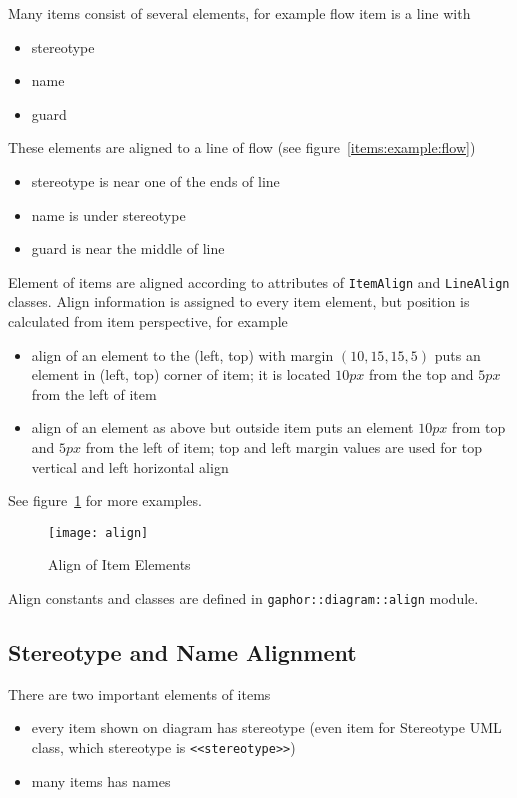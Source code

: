 \documentclass{book}
\newcommand{\rmodule}[1]{\texttt{#1}}
\newcommand{\rclass}[1]{\texttt{#1}}
\newcommand{\rstereotype}[1]{\texttt{<<#1>>}}
\begin{document}
Many items consist of several elements, for example flow item is a line
with
\begin{itemize}
\item stereotype
\item name
\item guard
\end{itemize}
These elements are aligned to a line of flow (see
figure~\ref{items:example:flow})
\begin{itemize}
\item stereotype is near one of the ends of line
\item name is under stereotype
\item guard is near the middle of line
\end{itemize}

Element of items are aligned according to attributes of
\rclass{ItemAlign} and \rclass{LineAlign} classes. Align information is
assigned to every item element, but position is calculated from item
perspective, for example
\begin{itemize}
\item align of an element to the (left, top) with margin $(10, 15, 15, 5)$
puts an element in (left, top) corner of item; it is located $10px$ from the top
and $5px$ from the left of item
\item align of an element as above but outside item puts an element $10px$
from top and $5px$ from the left of item; top and left margin values are
used for top vertical and left horizontal align
\end{itemize}
See figure~\ref{items:align} for more examples.

\begin{figure}
\begin{center}
\texttt{[image: align]}
\end{center}
\caption{Align of Item Elements}\label{items:align}
\end{figure}

Align constants and classes are defined in \rmodule{gaphor::diagram::align} module.

\subsection{Stereotype and Name Alignment}

There are two important elements of items
\begin{itemize}
\item every item shown on diagram has stereotype (even item for Stereotype
    UML class, which stereotype is \rstereotype{stereotype})
\item many items has names
\end{itemize}
\end{document}

